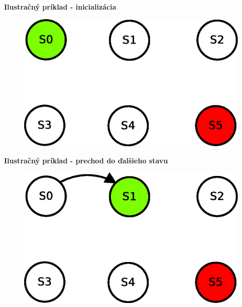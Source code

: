 \documentclass[xcolor=dvipsnames]{beamer}
\begin{document}
\begin{frame}{\bf Ilustračný príklad - inicializácia}

\begin{figure}[!htb]
\includegraphics[scale=.5]{../diagrams/q_learning_table_01.eps}
\end{figure}

\end{frame}

\begin{frame}{\bf Ilustračný príklad - prechod do ďalšieho stavu}

\begin{figure}[!htb]
\includegraphics[scale=.5]{../diagrams/q_learning_table_02.eps}
\end{figure}

\end{frame}
\end{document}
